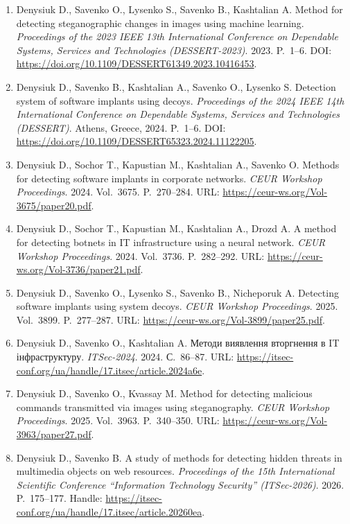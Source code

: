 \begin{enumerate}[label=\arabic*.,start=3]
\item Denysiuk D., Savenko O., Lysenko S., Savenko B., Kashtalian A. Method for detecting steganographic changes in images using machine learning. \textit{Proceedings of the 2023 IEEE 13th International Conference on Dependable Systems, Services and Technologies (DESSERT-2023)}. 2023. P.~1--6. DOI: \url{https://doi.org/10.1109/DESSERT61349.2023.10416453}.
\item Denysiuk D., Savenko B., Kashtalian A., Savenko O., Lysenko S. Detection system of software implants using decoys. \textit{Proceedings of the 2024 IEEE 14th International Conference on Dependable Systems, Services and Technologies (DESSERT)}. Athens, Greece, 2024. P.~1--6. DOI: \url{https://doi.org/10.1109/DESSERT65323.2024.11122205}.
\item Denysiuk D., Sochor T., Kapustian M., Kashtalian A., Savenko O. Methods for detecting software implants in corporate networks. \textit{CEUR Workshop Proceedings}. 2024. Vol.~3675. P.~270--284. URL: \url{https://ceur-ws.org/Vol-3675/paper20.pdf}.
\item Denysiuk D., Sochor T., Kapustian M., Kashtalian A., Drozd A. A method for detecting botnets in IT infrastructure using a neural network. \textit{CEUR Workshop Proceedings}. 2024. Vol.~3736. P.~282--292. URL: \url{https://ceur-ws.org/Vol-3736/paper21.pdf}.
\item Denysiuk D., Savenko O., Lysenko S., Savenko B., Nicheporuk A. Detecting software implants using system decoys. \textit{CEUR Workshop Proceedings}. 2025. Vol.~3899. P.~277--287. URL: \url{https://ceur-ws.org/Vol-3899/paper25.pdf}.
\item Denysiuk D., Savenko O., Kashtalian A. Методи виявлення вторгнення в IT інфраструктуру. \textit{ITSec-2024}. 2024. С.~86--87. URL: \url{https://itsec-conf.org/ua/handle/17.itsec/article.2024a6e}.
\item Denysiuk D., Savenko O., Kvassay M. Method for detecting malicious commands transmitted via images using steganography. \textit{CEUR Workshop Proceedings}. 2025. Vol.~3963. P.~340--350. URL: \url{https://ceur-ws.org/Vol-3963/paper27.pdf}.
\item Denysiuk D., Savenko B. A study of methods for detecting hidden threats in multimedia objects on web resources. \textit{Proceedings of the 15th International Scientific Conference ``Information Technology Security'' (ITSec-2026)}. 2026. P.~175--177. Handle: \url{https://itsec-conf.org/ua/handle/17.itsec/article.20260ea}.
\end{enumerate}
